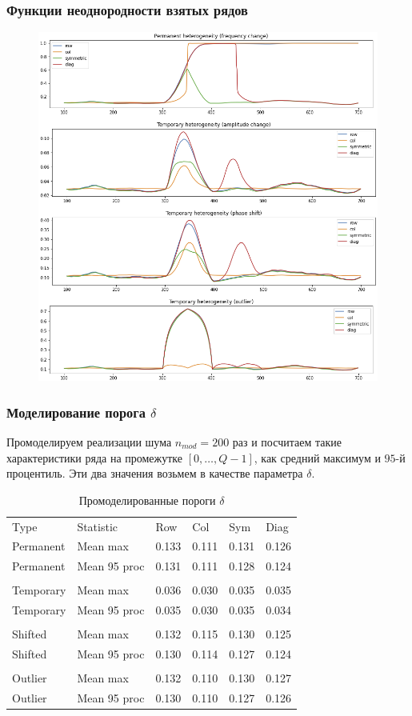 \documentclass[11pt]{beamer}
\begin{document}
	\begin{frame}
		\frametitle{Функции неоднородности взятых рядов}
		\begin{figure}[b]
			\centering
			\includegraphics[width=0.65\linewidth]{imgs/detectionNoisedTests}
		\end{figure}
		
	\end{frame}

	\begin{frame}
		\frametitle{Моделирование порога $ \delta $}
		Промоделируем реализации шума $n_{mod}=200$ раз и посчитаем такие характеристики ряда на промежутке $[0, \dots, Q-1]$, как средний максимум и $95$-й процентиль. Эти два значения возьмем в качестве параметра $\delta$. 
		\scriptsize
		\begin{table}[!hhh]
			\caption{Промоделированные пороги $ \delta $}
			\begin{tabular}{llllll}
				Type & Statistic & Row & Col & Sym & Diag \\
				Permanent & Mean max & 0.133 & 0.111 & 0.131 & 0.126  \\
				Permanent & Mean 95 proc & 0.131 & 0.111 & 0.128 & 0.124 \\
				&&&&&\\
				Temporary & Mean max & 0.036 & 0.030 & 0.035 & 0.035  \\
				Temporary & Mean 95 proc & 0.035 & 0.030 & 0.035 & 0.034  \\
				&&&&&\\
				Shifted & Mean max & 0.132 & 0.115 & 0.130 & 0.125  \\
				Shifted & Mean 95 proc & 0.130 & 0.114 & 0.127 & 0.124  \\
				&&&&&\\
				Outlier & Mean max & 0.132 & 0.110 & 0.130 & 0.127  \\
				Outlier & Mean 95 proc & 0.130 & 0.110 & 0.127 & 0.126  \\
			\end{tabular}
		\end{table}
		
	\end{frame}
	
\end{document}
